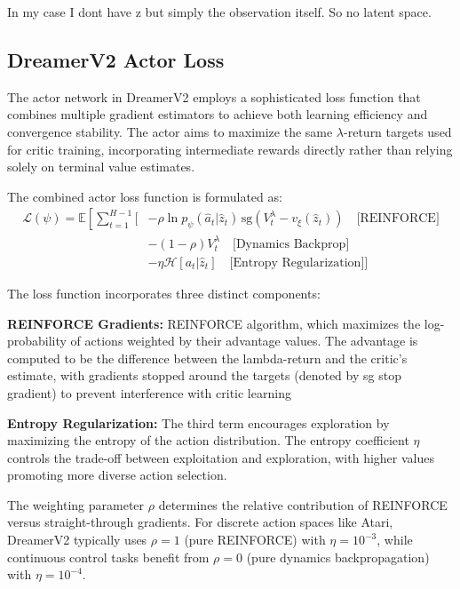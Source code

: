 \documentclass[
	english,
	ruledheaders=section,
	class=report,
	thesis={type=master},
	accentcolor=9c,
	custommargins=true,
	marginpar=false,
	parskip=half-,
	fontsize=11pt,
]{tudapub}
\begin{document}
In my case I dont have z but simply the observation itself. So no latent space.




\subsection{DreamerV2 Actor Loss}
\label{subsec:actor_loss}

The actor network in DreamerV2 employs a sophisticated loss function that combines multiple gradient estimators to achieve both learning efficiency and convergence stability. The actor aims to maximize the same $\lambda$-return targets used for critic training, incorporating intermediate rewards directly rather than relying solely on terminal value estimates.

The combined actor loss function is formulated as:
\begin{align}
\mathcal{L}(\psi) = \mathbb{E}\left[\sum_{t=1}^{H-1} \Big[\right. & -\rho \ln p_\psi(\hat{a}_t | \hat{z}_t) \, \text{sg}(V^{\lambda}_t - v_\xi(\hat{z}_t)) \quad \text{[REINFORCE]} \\
& -(1-\rho)V^{\lambda}_t \quad \text{[Dynamics Backprop]} \\
& -\eta \mathcal{H}[a_t|\hat{z}_t] \quad \text{[Entropy Regularization]} \Big]
\end{align}

The loss function incorporates three distinct components:

\textbf{REINFORCE Gradients:}  REINFORCE algorithm, which maximizes the log-probability of actions weighted by their advantage values. The advantage is computed to be the difference between the lambda-return and the critic's estimate, with gradients stopped around the targets (denoted by sg stop gradient) to prevent interference with critic learning

\textbf{Entropy Regularization:} The third term encourages exploration by maximizing the entropy of the action distribution. The entropy coefficient $\eta$ controls the trade-off between exploitation and exploration, with higher values promoting more diverse action selection.

The weighting parameter $\rho$ determines the relative contribution of REINFORCE versus straight-through gradients. For discrete action spaces like Atari, DreamerV2 typically uses $\rho = 1$ (pure REINFORCE) with $\eta = 10^{-3}$, while continuous control tasks benefit from $\rho = 0$ (pure dynamics backpropagation) with $\eta = 10^{-4}$.
\end{document}
